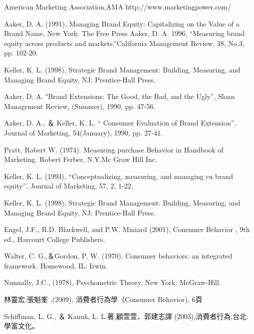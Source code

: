 \documentclass[a4paper,12pt]{report}
\begin{document}
\begin{thebibliography}{1}


American Marketing Association,AMA http://www.marketingpower.com/

Aaker, D. A. (1991), Managing Brand Equity: Capitalizing on the Value of a Brand Name, New
York: The Free Press
Aaker, D. A. 1996, “Measuring brand equity across products and markets.”California Management Review, 38, No.3, pp. 102-20.

Keller, K. L. (1998), Strategic Brand Management: Building, Measuring, and Managing
Brand Equity, NJ: Prentice-Hall Press.

Aaker, D. A. "Brand Extensions: The Good, the Bad, and the Ugly”, Sloan 
Management Review, (Summer), 1990, pp. 47-56. 

Aaker, D. A.,  ＆ Keller, K. L. “
Consumer Evaluation of Brand Extension”, 
Journal of Marketing, 54(January), 1990, pp. 27-41.

Pratt, Robert W. (1974). Measuring purchase Behavior in Handbook of Marketing. Robert Ferber, N.Y.Mc Graw Hill Inc.

Keller, K. L. (1993), “Conceptualizing, measuring, and managing cu
brand equity”, Journal of Marketing, 57, 2, 1-22. 

Keller, K. L. (1998), Strategic Brand Management: Building, Measuring, and Managing
Brand Equity, NJ: Prentice-Hall Press.

Engel, J.F., R.D. Blackwell, and P.W. Miniard (2001), Consumer Behavior , 9th
ed., Harcourt College Publishers.

Walter, C. G.,＆Gordon, P. W. (1970). Consumer behaviors: an integrated framework. Homewood, IL: Irwin.

Nunnally, J.C., (1978), Psychometric Theory, New York: McGraw-Hill. 

林靈宏,張魁峯 ,(2009), 消費者行為學（Consumer Behavior), 6頁

Schiffman, L. G.,  ＆ Kanuk, L. L.著,顧萱萱、郭建志譯 (2003),消費者行為,台北: 學富文化。
\end{thebibliography}
\clearpage
\end{document}
